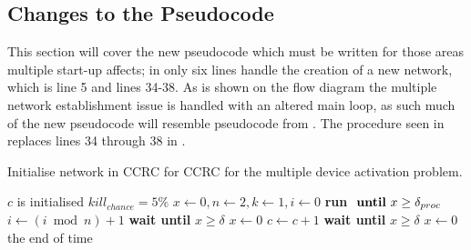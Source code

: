 \subsection{Changes to the Pseudocode}
This section will cover the new pseudocode which must be written for those areas multiple start-up affects; in  only six lines handle the creation of a new network, which is line 5 and lines 34-38.
As is shown on the flow diagram  the multiple network establishment issue is handled with an altered main loop, as such much of the new pseudocode will resemble pseudocode from .
The procedure seen in  replaces lines 34 through 38 in . 
\begin{algorithm}
\caption{Initialise network in CCRC for CCRC for the multiple device activation problem.}
\label{lst:networkMultiStartCCRC2}
\begin{algorithmic}[1]
\Require $c$ is initialised 
\Require $kill_{chance} = 5\%$ 
    \State $x \gets 0, n \gets 2, k \gets 1, i \gets 0$
    \Repeat {}
        \State \textbf{run}  $\text{ \textbf{until} }x \ge \delta_{proc}$
        \State $i \gets (i \bmod n) + 1$ 
            \State {} 
            \State {}
        \Else
                    \State {}
                    \State {}
                        \State \textbf{wait until } $x \ge \delta$  
                        \State $x \gets 0$
                        \State {}
                    \EndIf
                \Else
                     
                        \State $c \gets c + 1$
                        \State {} 
                    \EndIf
                \EndIf
            \EndWhile
        \EndIf
        \State \textbf{wait until } $x \ge \delta$  
        \State $x \gets 0$
    \Until the end of time
\EndProcedure    
\end{algorithmic}
\end{algorithm}

